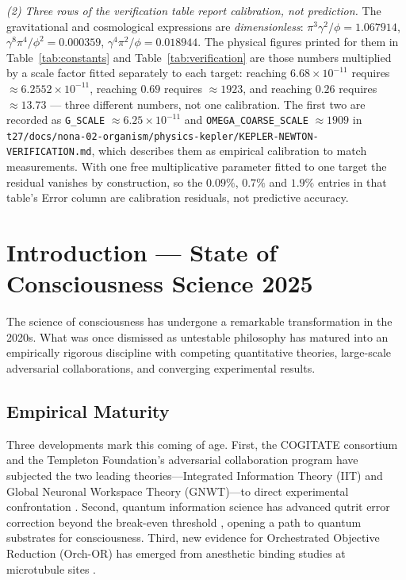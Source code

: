 \documentclass[12pt,a4paper]{article}
\begin{document}
\emph{(2) Three rows of the verification table report calibration, not
prediction.} The gravitational and cosmological expressions are
\emph{dimensionless}: $\pi^3\gamma^2/\phi = 1.067914$,
$\gamma^8\pi^4/\phi^2 = 0.000359$, $\gamma^4\pi^2/\phi = 0.018944$. The physical
figures printed for them in Table~\ref{tab:constants} and
Table~\ref{tab:verification} are those numbers multiplied by a scale factor
fitted separately to each target: reaching $6.68\times10^{-11}$ requires
$\approx 6.2552\times10^{-11}$, reaching $0.69$ requires $\approx 1923$, and
reaching $0.26$ requires $\approx 13.73$ --- three different numbers, not one
calibration. The first two are recorded as \texttt{G\_SCALE} $\approx
6.25\times10^{-11}$ and \texttt{OMEGA\_COARSE\_SCALE} $\approx 1909$ in
\nolinkurl{t27/docs/nona-02-organism/physics-kepler/KEPLER-NEWTON-VERIFICATION.md},
which describes them as empirical calibration to match measurements. With one
free multiplicative parameter fitted to one target the residual vanishes by
construction, so the $0.09\%$, $0.7\%$ and $1.9\%$ entries in that table's Error
column are calibration residuals, not predictive accuracy.

\tableofcontents
\newpage

\section{Introduction --- State of Consciousness Science 2025}
\label{sec:introduction}

The science of consciousness has undergone a remarkable transformation in the
2020s. What was once dismissed as untestable philosophy has matured into an
empirically rigorous discipline with competing quantitative theories, large-scale
adversarial collaborations, and converging experimental results.

\subsection{Empirical Maturity}

Three developments mark this coming of age. First, the COGITATE consortium and
the Templeton Foundation's adversarial collaboration program have subjected the
two leading theories---Integrated Information Theory (IIT) and Global Neuronal
Workspace Theory (GNWT)---to direct experimental confrontation
\cite{Nature2025Adversarial}. Second, quantum information science has advanced
qutrit error correction beyond the break-even threshold \cite{Nature2025Qutrits},
opening a path to quantum substrates for consciousness. Third, new evidence for
Orchestrated Objective Reduction (Orch-OR) has emerged from anesthetic binding
studies at microtubule sites \cite{Wiest2025}.
\end{document}
